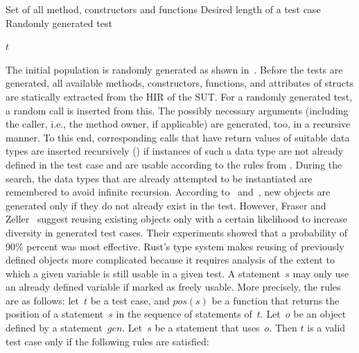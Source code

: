 \documentclass[paper=a4,%
  twoside,%
  BCOR4mm,%
  abstract=true,%
  toc=bibliography,%
  chapterprefix=true,%
  toc=bibliographynumbered,%
  open=right,%
  english,%
  pagesize=pdftex]{scrreprt}
\newcommand{\Desc}[2]{\State \makebox[2em][l]{#1}#2}
\newcommand{\hir}{\ac{HIR}\xspace}
\begin{document}
\begin{algorithm}[t]
\caption{$GenTest(M, l)$}\label{alg:random-generation-of-a-test}
\begin{algorithmic}
\Input
  \Desc{$M$}{Set of all method, constructors and functions}
  \Desc{$l$}{Desired length of a test case}
\EndInput
\Output
  \Desc{$t$}{Randomly generated test}
\EndOutput
{}


\EndFor
{}

    \EndIf
  \EndFor
\EndWhile
\State \Return $t$
\end{algorithmic}
\end{algorithm}

The initial population is randomly generated as shown in~. Before the tests are generated, all available methods, constructors, functions, and attributes of structs are statically extracted from the \hir of the \ac{SUT}. For a randomly generated test, a random call is inserted from this. The possibly necessary arguments (including the caller, i.e., the method owner, if applicable) are generated, too, in a recursive manner. To this end, corresponding calls that have return values of suitable data types are inserted recursively () if instances of such a data type are not already defined in the test case and are usable according to the rules from . During the search, the data types that are already attempted to be instantiated are remembered to avoid infinite recursion. According to~ and~, new objects are generated only if they do not already exist in the test. However, Fraser and Zeller~\cite{Fraser2012} suggest reusing existing objects only with a certain likelihood to increase diversity in generated test cases. Their experiments showed that a probability of 90\% percent was most effective. Rust's type system makes reusing of previously defined objects more complicated because it requires analysis of the extent to which a given variable is still usable in a given test. A statement~$s$ may only use an already defined variable if marked as freely usable. More precisely, the rules are as follows: let~$t$ be a test case, and $pos(s)$ be a function that returns the position of a statement~$s$ in the sequence of statements of~$t$. Let~$o$ be an object defined by a statement~$gen$. Let~$s$ be a statement that uses~$o$. Then $t$ is a valid test case only if the following rules are satisfied:
\end{document}
